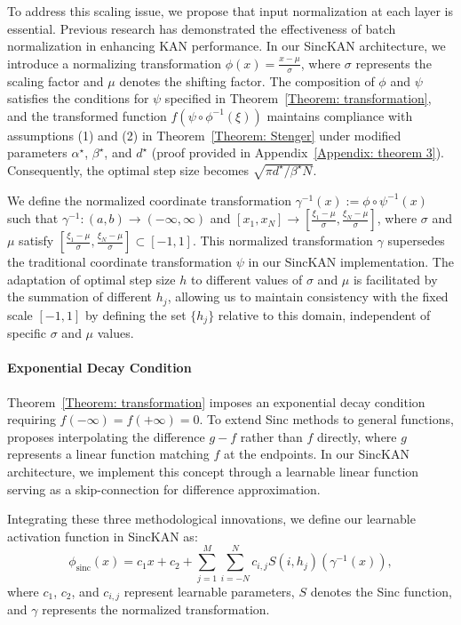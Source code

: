 To address this scaling issue, we propose that input normalization at each layer is essential. Previous research \citep{bozorgasl2024wav} has demonstrated the effectiveness of batch normalization \citep{ioffe2015batch} in enhancing KAN performance. In our SincKAN architecture, we introduce a normalizing transformation $\phi(x)=\frac{x-\mu}{\sigma}$, where $\sigma$ represents the scaling factor and $\mu$ denotes the shifting factor. The composition of $\phi$ and $\psi$ satisfies the conditions for $\psi$ specified in Theorem~\ref{Theorem: transformation}, and the transformed function $f(\psi \circ \phi^{-1}(\xi))$ maintains compliance with assumptions (1) and (2) in Theorem~\ref{Theorem: Stenger} under modified parameters $\alpha^{\star}$, $\beta^\star$, and $d^\star$ (proof provided in Appendix~\ref{Appendix: theorem 3}). Consequently, the optimal step size becomes $\sqrt{\pi d^\star/\beta^\star N}$.

We define the normalized coordinate transformation $\gamma^{-1}(x) := \phi \circ \psi^{-1}(x)$ such that $\gamma^{-1}: (a,b) \rightarrow (-\infty,\infty)$ and $[x_1,x_N] \rightarrow [\frac{\xi_1-\mu}{\sigma},\frac{\xi_N-\mu}{\sigma}]$, where $\sigma$ and $\mu$ satisfy $[\frac{\xi_1-\mu}{\sigma},\frac{\xi_N-\mu}{\sigma}] \subset [-1,1]$. This normalized transformation $\gamma$ supersedes the traditional coordinate transformation $\psi$ in our SincKAN implementation. The adaptation of optimal step size $h$ to different values of $\sigma$ and $\mu$ is facilitated by the summation of different $h_j$, allowing us to maintain consistency with the fixed scale $[-1,1]$ by defining the set $\{h_j\}$ relative to this domain, independent of specific $\sigma$ and $\mu$ values.

\paragraph{Exponential Decay Condition}
Theorem~\ref{Theorem: transformation} imposes an exponential decay condition requiring $f(-\infty)=f(+\infty)=0$. To extend Sinc methods to general functions, \citep{richardson2011sinc} proposes interpolating the difference $g-f$ rather than $f$ directly, where $g$ represents a linear function matching $f$ at the endpoints. In our SincKAN architecture, we implement this concept through a learnable linear function serving as a skip-connection for difference approximation.

Integrating these three methodological innovations, we define our learnable activation function in SincKAN as:
\begin{equation}\label{eq: Sinc activation function}
    \phi_{\mathrm{sinc}}(x) = c_1x+c_2+ \sum_{j=1}^{M}\sum_{i=-N}^N c_{i,j} S(i, h_j)(\gamma^{-1}(x)),
\end{equation}
where $c_1$, $c_2$, and $c_{i,j}$ represent learnable parameters, $S$ denotes the Sinc function, and $\gamma$ represents the normalized transformation.

